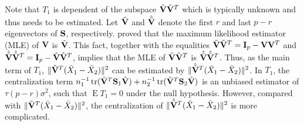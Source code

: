 \documentclass[3p]{elsarticle}
\DeclareMathOperator{\mytr}{tr}
\DeclareMathOperator{\myE}{E}
\theoremstyle{plain}
\theoremstyle{definition}
\newtheorem{remark}{\quad\quad Remark}
\theoremstyle{remark}
\begin{document}

Note that $T_1$ %
is dependent of the subspace $\tilde{\mathbf{V}}\tilde{\mathbf{V}}^T$ which is typically unknown and thus needs to be estimated.
Let $\hat{\mathbf{V}}$ and $\hat{\tilde{\mathbf{V}}}$ denote the first $r$ and last $p-r$ eigenvectors of $\mathbf{S}$, respectively.
\cite{Anderson1986Asymptotic} proved that the maximum likelihood estimator (MLE) of $\mathbf{V}$ is $\hat{\mathbf{V}}$.
This fact, together with the equalities $\tilde{\mathbf{V}}\tilde{\mathbf{V}}^T= \mathbf{I}_p-\mathbf{V}\mathbf{V}^T$ and $\hat{\tilde{\mathbf{V}}}\hat{\tilde{\mathbf{V}}}^T= \mathbf{I}_p-\hat{\mathbf{V}}\hat{\mathbf{V}}^T$, implies that 
the MLE of $\tilde{\mathbf{V}}\tilde{\mathbf{V}}^T$ is $\hat{\tilde{\mathbf{V}}}\hat{\tilde{\mathbf{V}}}^T$.
Thus, as the main term of $T_1$,
$\|\tilde{\mathbf{V}}^T (\bar{X}_1-\bar{X}_2)\|^2$ can be estimated by $\|\hat{\tilde{\mathbf{V}}}^T (\bar{X}_1-\bar{X}_2)\|^2$.
In $T_1$, the centralization term $n_1^{-1}\mytr(\tilde{\BV}^T \BS_1\tilde{\BV})+n_2^{-1}\mytr(\tilde{\BV}^T \BS_2\tilde{\BV})$ is an unbiased estimator of $\tau (p-r)\sigma^2$, such that $\myE T_1=0$ under the null hypothesis.
However, compared with $\|\tilde{\mathbf{V}}^T (\bar{X}_1-\bar{X}_2)\|^2$, the centralization of $\|\hat{\tilde{\mathbf{V}}}^T (\bar{X}_1-\bar{X}_2)\|^2$ is more complicated.
\end{document}
